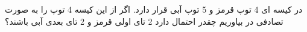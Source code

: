در کیسه ای 4 توپ قرمز و 5 توپ آبی قرار دارد.
اگر از این کیسه 4 توپ را به صورت تصادفی در بیاوریم چقدر احتمال دارد 2 تای اولی قرمز و 2 تای بعدی آبی باشند؟

\\
